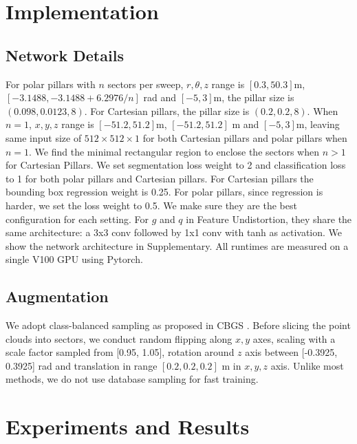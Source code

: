 \documentclass{article}
\begin{document}
\section{Implementation}\label{implement}\vspace{-2mm}
\subsection{Network Details}\vspace{-2mm}
For polar pillars with $n$ sectors per sweep, $r, \theta, z$ range is $[0.3, 50.3]$m, $[-3.1488, -3.1488 + 6.2976/n]$ rad and $[-5,3]$m, the pillar size is $(0.098, 0.0123, 8)$. For Cartesian pillars, the pillar size is $(0.2, 0.2, 8)$. When $n=1$, $x, y, z$ range is $[-51.2, 51.2]$m, $[-51.2, 51.2]$ m and $[-5,3]$m, leaving same input size of $512\times 512 \times 1$ for both Cartesian pillars and polar pillars when $n=1$. We find the minimal rectangular region to enclose the sectors when $n > 1$ for Cartesian Pillars. We set segmentation loss weight to 2 and classification loss to 1 for both polar pillars and Cartesian pillars. For Cartesian pillars the bounding box regression weight is 0.25. For polar pillars, since regression is harder, we set the loss weight to 0.5. We make sure they are the best configuration for each setting. For $g$ and $q$ in Feature Undistortion, they share the same architecture: a 3x3 conv followed by 1x1 conv with tanh as activation. We show the network architecture in Supplementary. All runtimes are measured on a single V100 GPU using Pytorch.

\vspace{-3mm}\subsection{Augmentation}\vspace{-2mm}
We adopt class-balanced sampling as proposed in CBGS \cite{zhu2019class}. Before slicing the point clouds into sectors, we conduct random flipping along $x,y$ axes, scaling with a scale factor sampled from [0.95, 1.05], rotation around $z$ axis between [-0.3925, 0.3925] rad and translation in range $[0.2, 0.2, 0.2]$ m in $x,y,z$ axis. Unlike most methods, we do not use database sampling\cite{yan2018second} for fast training.
\vspace{-3mm}\section{Experiments and Results}\vspace{-3mm}
\label{results}
\end{document}
